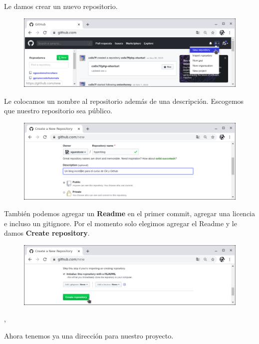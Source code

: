 \documentclass{article}
\begin{document}
Le damos crear un nuevo repositorio.

\begin{figure}[h!]
  \centering
  \includegraphics[scale=0.75]{./Pictures/183_new_repository.png}
\end{figure}

Le colocamos un nombre al repositorio además de una descripción. Escogemos que
nuestro repositorio sea público.

\begin{figure}[h!]
  \centering
  \includegraphics[scale=0.75]{./Pictures/184_new_repository.png}
\end{figure}

También podemos agregar un \textbf{Readme} en el primer commit, agregar una
licencia e incluso un gitignore. Por el momento solo elegimos agregar el Readme
y le damos \textbf{Create repository}.\\

\begin{figure}[h!]
  \centering
  \includegraphics[scale=0.75]{./Pictures/185_new_repository.png}
\end{figure},

\newpage

Ahora tenemos ya una dirección para nuestro proyecto.
\end{document}
